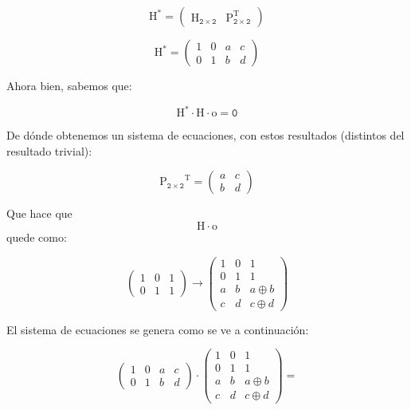 \begin{enumerate}
\begin{enumerate}
\begin{enumerate}
\begin{enumerate}
        \[\mathtt{\mathrm{H}}^{\mathbf{\mathrm{\ast}}} = \begin{pmatrix}
        \mathtt{\mathrm{H}_{2 \times 2}} & \mathtt{\mathrm{P}_{2 \times 2}^{\mathrm{T}}}
        \end{pmatrix}\]

        \[\mathtt{\mathrm{H}^{\mathbf{\mathrm{\ast}}}} = \begin{pmatrix}
        1 & 0 & a & c \\
        0 & 1 & b & d
        \end{pmatrix}\]

        Ahora bien, sabemos que:

        \[{{\mathtt{\mathrm{H}^{\mathbf{\mathrm{\ast}}}} \cdot \mathtt{\mathrm{H}}} \cdot \mathtt{\mathrm{o}}} = \mathtt{0}\]

        De dónde obtenemos un sistema de ecuaciones, con estos
        resultados (distintos del resultado trivial):

        \[\mathtt{{\mathrm{P}_{2 \times 2}}^{\mathbf{\mathrm{T}}}} = \begin{pmatrix}
        a & c \\
        b & d
        \end{pmatrix}\]

        Que hace
        que\[\mathtt{\mathrm{H}} \cdot \mathtt{\mathrm{o}}\]quede como:

        \[\begin{pmatrix}
        1 & 0 & 1 \\
        0 & 1 & 1
        \end{pmatrix}\rightarrow\begin{pmatrix}
        1 & 0 & 1 \\
        0 & 1 & 1 \\
        a & b & {a \oplus b} \\
        c & d & {c \oplus d}
        \end{pmatrix}\]

        El sistema de ecuaciones se genera como se ve a continuación:

        \[{\begin{pmatrix}
        1 & 0 & a & c \\
        0 & 1 & b & d
        \end{pmatrix} \cdot \begin{pmatrix}
        1 & 0 & 1 \\
        0 & 1 & 1 \\
        a & b & {a \oplus b} \\
        c & d & {c \oplus d}
        \end{pmatrix}} = {}\]


\end{enumerate}
\end{enumerate}
\end{enumerate}
\end{enumerate}
